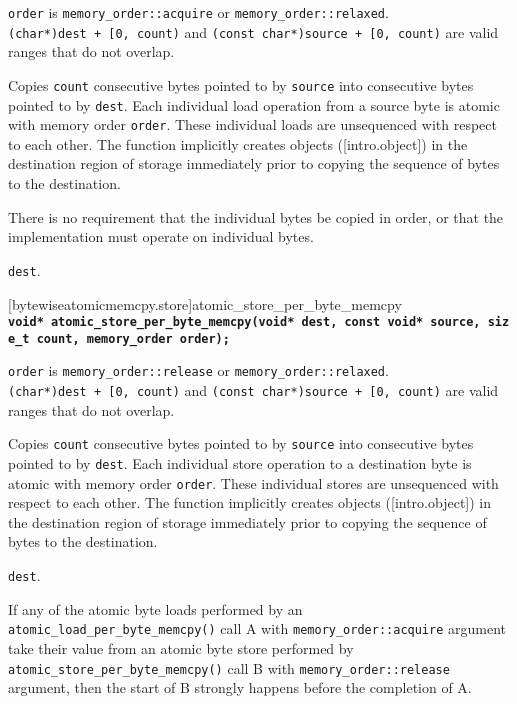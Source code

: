 \begin{itemdescr}
\pnum
\expects

\texttt{order} is \texttt{memory\_order::acquire} or
\texttt{memory\_order::relaxed}. \texttt{(char*)dest\ +\ {[}0,\ count)}
and \texttt{(const\ char*)source\ +\ {[}0,\ count)} are valid ranges
that do not overlap.

\pnum
\effects
Copies \texttt{count} consecutive bytes pointed to by
\texttt{source} into consecutive bytes pointed to by \texttt{dest}. Each
individual load operation from a source byte is atomic with memory order
\texttt{order}. These individual loads are unsequenced with respect to
each other. The function implicitly creates objects ({[}intro.object{]})
in the destination region of storage immediately prior to copying the
sequence of bytes to the destination. 
\begin{note} There is no requirement
that the individual bytes be copied in order, or that the implementation
must operate on individual bytes. \end{note}

\pnum
\returns
\texttt{dest}.
\end{itemdescr}

[bytewiseatomicmemcpy.store]{atomic_store_per_byte_memcpy}
\textbf{\texttt{void*\ atomic\_store\_per\_byte\_memcpy(void*\ dest,\ const\ void*\ source,\ size\_t\ count,\ memory\_order\ order);}}

\begin{itemdescr}
\pnum
\expects
\texttt{order} is \texttt{memory\_order::release} or
\texttt{memory\_order::relaxed}. \texttt{(char*)dest\ +\ {[}0,\ count)}
and \texttt{(const\ char*)source\ +\ {[}0,\ count)} are valid ranges
that do not overlap.

\pnum
\effects
Copies \texttt{count} consecutive bytes pointed to by
\texttt{source} into consecutive bytes pointed to by \texttt{dest}. Each
individual store operation to a destination byte is atomic with memory
order \texttt{order}. These individual stores are unsequenced with
respect to each other. The function implicitly creates objects
({[}intro.object{]}) in the destination region of storage immediately
prior to copying the sequence of bytes to the destination.

\pnum
\returns

\texttt{dest}.
\end{itemdescr}

\begin{note} If any of the atomic byte loads performed by an
\texttt{atomic\_load\_per\_byte\_memcpy()} call A with
\texttt{memory\_order::acquire} argument take their value from an atomic
byte store performed by \texttt{atomic\_store\_per\_byte\_memcpy()} call
B with \texttt{memory\_order::release} argument, then the start of B
strongly happens before the completion of A. 
\end{note}  
